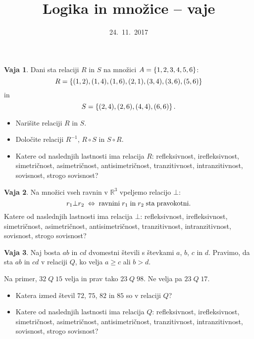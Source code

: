 \documentclass{article}
\theoremstyle{definition}
\newtheorem{vaja}{Vaja}
\begin{document}
\title{Logika in množice -- vaje}
\date{24.~11.~2017}
\maketitle

\begin{vaja}
Dani sta relaciji $R$ in $S$ na množici $A = \set{1,2,3,4,5,6}$:
\[R = \set{(1,2),(1,4),(1,6),(2,1),(3,4),(3,6),(5,6)}\]
in
\[S = \set{(2,4),(2,6),(4,4),(6,6)}.\]
\begin{itemize}
\item Narišite relaciji $R$ in $S$.
\item Določite relaciji $R^{-1}$, $R \circ S$ in $S \circ R$.
\item Katere od naslednjih lastnosti ima relacija $R$:
refleksivnost, irefleksivnost, simetričnost, asimetričnost, antisimetričnost,
tranzitivnost, intranzitivnost, sovisnost, strogo sovisnost?
\end{itemize}
\end{vaja}

\begin{vaja}
Na množici vseh ravnin v $\mathbb{R}^3$ vpeljemo relacijo $\bot$:
$$r_1\bot r_2\;\Leftrightarrow\;{\rm ravnini\;}r_1\;{\rm in\;}r_2\;{\rm sta\;pravokotni.}$$
Katere od naslednjih lastnosti ima relacija $\bot$:
refleksivnost, irefleksivnost, simetričnost, asimetričnost, antisimetričnost,
tranzitivnost, intranzitivnost, sovisnost, strogo sovisnost?
\end{vaja}

\begin{vaja}
Naj bosta $ab$ in $cd$ dvomestni števili s števkami $a$, $b$, $c$ in $d$.
Pravimo, da sta $ab$ in $cd$ v relaciji $Q$, ko velja $a \geq c$ ali $b > d$.

Na primer, $32 \; Q \; 15$ velja in prav tako $23 \; Q \; 98$. Ne velja pa
$23 \; Q \; 17$.


\begin{itemize}
\item Katera izmed števil $72$, $75$, $82$ in $85$ so v relaciji $Q$?
\item Katere od naslednjih lastnosti ima relacija $Q$:
refleksivnost, irefleksivnost, simetričnost, asimetričnost, antisimetričnost,
tranzitivnost, intranzitivnost, sovisnost, strogo sovisnost?
\end{itemize}
\end{vaja}
\end{document}
